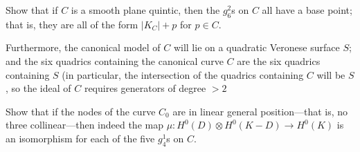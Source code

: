 \begin{exercise}
Show that if $C$ is a smooth plane quintic, then the $g^2_6$s on $C$ all have a base point; that is, they are all of the form $|K_C| + p$ for $p \in C$. 

Furthermore, the canonical model of $C$ will lie on a quadratic Veronese surface $S$; and the six
quadrics containing the canonical curve $C$ are the six quadrics containing $S$ (in particular, the intersection of the quadrics containing $C$ will be $S$, so
the ideal of $C$ requires generators of degree $>2$
\end{exercise} 
%

\begin{exercise}\label{nonreduced Wrd}
Show that if the nodes of the curve $C_0$ are in linear general position---that is, no three collinear---then indeed the map $\mu : H^0(D) \otimes H^0(K-D) \to H^0(K)$ is an isomorphism for each of the five $g^1_4$s on $C$.
\end{exercise}





